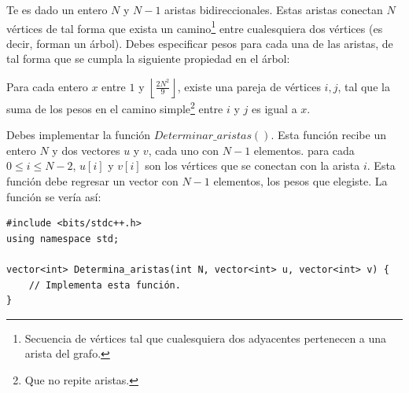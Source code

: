 \documentclass[12pt]{scrartcl}
\begin{document}
    
    
    \vspace{10pt}

    
    
        Te es dado un entero $N$ y $N - 1$ aristas bidireccionales. Estas aristas conectan $N$ vértices de tal forma que exista un camino\footnote{Secuencia de vértices tal que cualesquiera dos adyacentes pertenecen a una arista del grafo.} entre cualesquiera dos vértices (es decir, forman un árbol). Debes especificar pesos para cada una de las aristas, de tal forma que se cumpla la siguiente propiedad en el árbol:
        
        Para cada entero $x$ entre $1$ y $\left\lfloor \frac{2N^2}{9} \right\rfloor$, existe una pareja de vértices $i, j$, tal que la suma de los pesos en el camino simple\footnote{Que no repite aristas.} entre $i$ y $j$ es igual a $x$.
    

        Debes implementar la función $Determinar\_aristas()$. Esta función recibe un entero $N$ y dos vectores $u$ y $v$, cada uno con $N - 1$ elementos. para cada $0 \le i \le N - 2$, $u[i]$ y $v[i]$ son los vértices que se conectan con la arista $i$. Esta función debe regresar un vector con $N - 1$ elementos, los pesos que elegiste.
        La función se vería así:

\begin{verbatim}
#include <bits/stdc++.h>
using namespace std;

vector<int> Determina_aristas(int N, vector<int> u, vector<int> v) {
    // Implementa esta función.
}
\end{verbatim}

    
\end{document}
